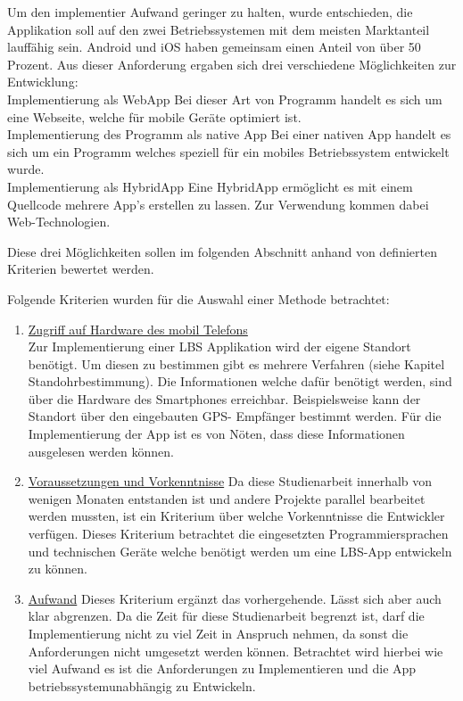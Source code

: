 Um den implementier Aufwand geringer zu halten, wurde entschieden, die Applikation 
soll auf den zwei Betriebssystemen mit dem meisten Marktanteil lauffähig sein. 
Android und iOS haben gemeinsam einen Anteil von über 50 Prozent. Aus dieser 
Anforderung ergaben sich drei verschiedene Möglichkeiten zur Entwicklung:
\\Implementierung als WebApp
Bei dieser Art von Programm handelt es sich um eine Webseite, welche für mobile 
Geräte optimiert ist.
\\Implementierung des Programm als native App
Bei einer nativen App handelt es sich um ein Programm welches speziell für ein mobiles Betriebssystem entwickelt wurde.
\\Implementierung als HybridApp
Eine HybridApp ermöglicht es mit einem Quellcode mehrere App's erstellen zu lassen. 
Zur Verwendung kommen dabei Web-Technologien.

Diese drei Möglichkeiten sollen im folgenden Abschnitt anhand von definierten 
Kriterien bewertet werden.


Folgende Kriterien wurden für die Auswahl einer Methode betrachtet:
\begin{enumerate}
\item \underline{Zugriff auf Hardware des mobil Telefons}
\\Zur Implementierung einer LBS Applikation wird der eigene Standort benötigt. Um 
diesen zu bestimmen gibt es mehrere Verfahren (siehe Kapitel Standohrbestimmung). 
Die Informationen welche dafür benötigt werden, sind über die Hardware des 
Smartphones erreichbar. Beispielsweise kann der Standort über den eingebauten GPS-
Empfänger bestimmt werden. Für die Implementierung der App ist es von Nöten, dass 
diese Informationen ausgelesen werden können.

\item \underline{Voraussetzungen und Vorkenntnisse}
Da diese Studienarbeit innerhalb von wenigen Monaten entstanden ist und andere Projekte 
parallel bearbeitet werden mussten, ist ein Kriterium über welche Vorkenntnisse die 
Entwickler verfügen. Dieses Kriterium betrachtet die eingesetzten 
Programmiersprachen und technischen Geräte welche benötigt werden um eine LBS-App 
entwickeln zu können.


\item \underline{Aufwand}
Dieses Kriterium ergänzt das vorhergehende. Lässt sich aber auch klar abgrenzen. Da 
die Zeit für diese Studienarbeit begrenzt ist, darf die Implementierung nicht zu 
viel Zeit in Anspruch nehmen, da sonst die Anforderungen nicht umgesetzt werden 
können. Betrachtet wird hierbei wie viel Aufwand es ist die Anforderungen zu 
Implementieren und die App betriebssystemunabhängig zu Entwickeln.
\end{enumerate}

